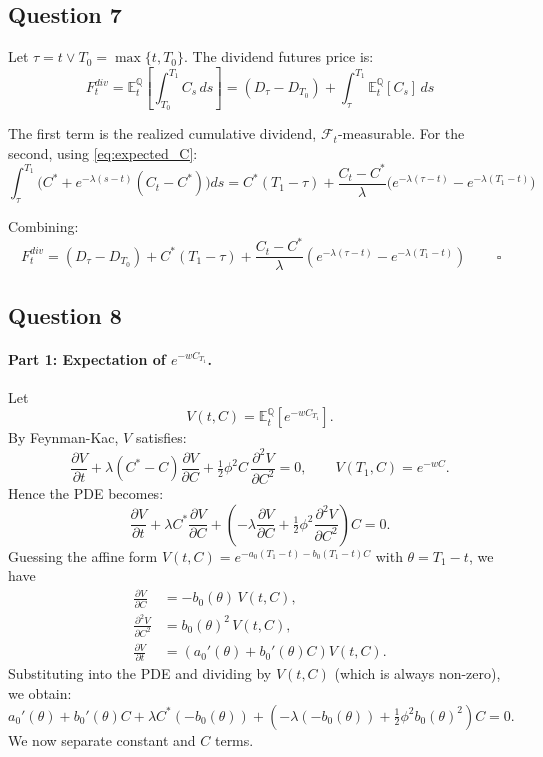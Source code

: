 \documentclass[12pt,a4paper]{article}
\begin{document}
\subsection*{Question 7}

Let $\tau = t \vee T_0 = \max\{t, T_0\}$. The dividend futures price is:
\begin{equation*}
    F_t^{div} = \mathbb{E}^{\mathbb{Q}}_t\!\left[\int_{T_0}^{T_1} C_s\,ds\right] = (D_\tau - D_{T_0}) + \int_\tau^{T_1} \mathbb{E}^{\mathbb{Q}}_t[C_s]\,ds
\end{equation*}

The first term is the realized cumulative dividend, $\mathcal{F}_t$-measurable. For the second, using \eqref{eq:expected_C}:
\begin{equation*}
    \int_\tau^{T_1} \big(C^* + e^{-\lambda(s-t)}(C_t - C^*)\big)ds = C^*(T_1 - \tau) + \frac{C_t - C^*}{\lambda}\big(e^{-\lambda(\tau-t)} - e^{-\lambda(T_1-t)}\big)
\end{equation*}

Combining:
\begin{equation*}
    \boxed{\,F_t^{div} = (D_\tau - D_{T_0}) + C^*(T_1 - \tau) + \frac{C_t - C^*}{\lambda}\!\left(e^{-\lambda(\tau-t)} - e^{-\lambda(T_1-t)}\right)\,} \qquad \square
\end{equation*}

\subsection*{Question 8}

\paragraph{Part 1: Expectation of $e^{-w C_{T_1}}$.}
Let
\[
V(t, C) = \mathbb{E}^{\mathbb{Q}}_t \left[e^{-w C_{T_1}}\right].
\]
By Feynman-Kac, $V$ satisfies:
\begin{equation*}
    \frac{\partial V}{\partial t}
    + \lambda(C^* - C)\frac{\partial V}{\partial C}
    + \tfrac{1}{2}\phi^2 C\,\frac{\partial^2 V}{\partial C^2}
    = 0,
    \qquad
    V(T_1, C) = e^{-wC}.
\end{equation*}
Hence the PDE becomes:
\[
\frac{\partial V}{\partial t}
+ \lambda C^*\frac{\partial V}{\partial C}
+ \left(
-\lambda \frac{\partial V}{\partial C}
+ \tfrac{1}{2}\phi^2 \frac{\partial^2 V}{\partial C^2}
\right) C
= 0.
\]
Guessing the affine form $V(t,C) = e^{-a_0(T_1-t) - b_0(T_1-t)C}$ with $\theta = T_1 - t$, we have
\begin{align*}
\frac{\partial V}{\partial C}
&= -b_0(\theta)\,V(t,C), \\
\frac{\partial^2 V}{\partial C^2}
&= b_0(\theta)^2\,V(t,C), \\
\frac{\partial V}{\partial t}
&= \left(a_0'(\theta) + b_0'(\theta)C\right)V(t,C).
\end{align*}
Substituting into the PDE and dividing by $V(t,C)$ (which is always non-zero), we obtain:
\[
a_0'(\theta) + b_0'(\theta)C
+ \lambda C^*(-b_0(\theta))
+ \left(
-\lambda(-b_0(\theta))
+ \tfrac{1}{2}\phi^2 b_0(\theta)^2
\right) C
= 0.
\]
We now separate constant and $C$ terms.
\end{document}
